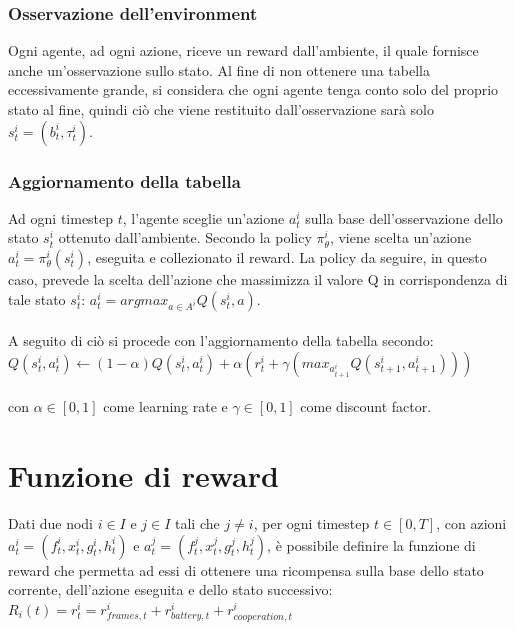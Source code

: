 \documentclass{article}
\begin{document}
{\subsubsection{Osservazione dell'environment}
Ogni agente, ad ogni azione, riceve un reward dall'ambiente, il quale fornisce anche un'osservazione sullo stato. Al fine di non ottenere una tabella eccessivamente grande, si considera che ogni agente tenga conto solo del proprio stato al fine, quindi ciò che viene restituito dall'osservazione sarà solo $s_t^i = (b_t^i, \tau_t^i)$.

\subsubsection{Aggiornamento della tabella}
Ad ogni timestep $t$, l'agente sceglie un'azione $a_t^i$ sulla base dell'osservazione dello stato $s_t^i$ ottenuto dall'ambiente. Secondo la policy $\pi_{\theta}^i$, viene scelta un'azione $a_t^i = \pi_\theta^i(s_t^i)$, eseguita e collezionato il reward. La policy da seguire, in questo caso, prevede la scelta  dell'azione che massimizza il valore Q in corrispondenza di tale stato $s_t^i$: $a_t^i = argmax_{a \in A^i} Q(s_t^i, a)$.\\\\ A seguito di ciò si procede con l'aggiornamento della tabella secondo:\\

$Q(s_t^i, a_t^i) \leftarrow (1-\alpha)Q(s_t^i, a_t^i) + \alpha(r_t^i + \gamma(max_{a_{t+1}^i} Q(s_{t+1}^i, a_{t+1}^i)))$ \\\\
con $\alpha \in [0, 1]$ come learning rate e $\gamma \in [0, 1]$ come discount factor. 

\section{Funzione di reward}
Dati due nodi $i \in I$ e $j \in I$ tali che $j \neq i$, per ogni timestep $t \in [0, T]$, con azioni $a_t^i = (f_t^i, x_t^i, g_t^i, h_t^i)$ e $a_t^j = (f_t^j, x_t^j, g_t^j, h_t^j)$, è possibile definire la funzione di reward che permetta ad essi di ottenere una ricompensa sulla base dello stato corrente, dell'azione eseguita e dello stato successivo:\\

$R_i(t) = r_t^i = r_{frames, t}^i + r_{battery, t}^i + r_{cooperation, t}^i$ 
\begin{algorithm}
    \caption{Algoritmo per ricompensa per gestione delle frame, $r_{frames, t}^i$}\label{alg:cap}
    \begin{algoerithmic}
    \Else
    \EndIf
    \end{algoerithmic}
\end{algorithm}

}
\end{document}
